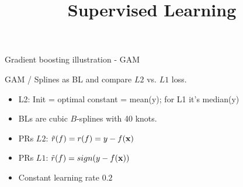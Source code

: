 \documentclass[11pt,compress,t,notes=noshow, xcolor=table]{beamer}
\title{Supervised Learning}
\date{}
\begin{document}


\begin{vbframe}{Gradient boosting illustration - GAM}

GAM / Splines as BL and compare $L2$ vs. $L1$ loss.
\vspace*{0.2cm}

\begin{itemize}
  \item L2: Init = optimal constant = mean(y);
      for L1 it's median(y)
    \item BLs are cubic $B$-splines with 40 knots.
\item PRs $L2$: $\tilde{r}(f) = r(f) = y - f(\mathbf{x})$
\item PRs $L1$: $\tilde{r}(f) = sign(y - f(\mathbf{x}))$
    \item Constant learning rate $0.2$ 
\end{itemize}


\end{vbframe}
\end{document}

